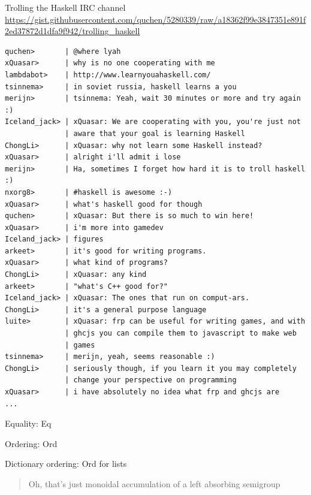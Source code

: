 \documentclass[8pt]{beamer}
\begin{document}
\begin{frame}[fragile]{Trolling the Haskell IRC channel}
{\tiny \url{https://gist.githubusercontent.com/quchen/5280339/raw/a18362f99e3847351e891f2ed37872d1dfa9f942/trolling_haskell}}
{\tiny
\begin{verbatim}
quchen>       | @where lyah
xQuasar>      | why is no one cooperating with me
lambdabot>    | http://www.learnyouahaskell.com/
tsinnema>     | in soviet russia, haskell learns a you
merijn>       | tsinnema: Yeah, wait 30 minutes or more and try again :)
Iceland_jack> | xQuasar: We are cooperating with you, you're just not 
              | aware that your goal is learning Haskell
ChongLi>      | xQuasar: why not learn some Haskell instead?
xQuasar>      | alright i'll admit i lose
merijn>       | Ha, sometimes I forget how hard it is to troll haskell :)
nxorg8>       | #haskell is awesome :-)
xQuasar>      | what's haskell good for though
quchen>       | xQuasar: But there is so much to win here!
xQuasar>      | i'm more into gamedev
Iceland_jack> | figures
arkeet>       | it's good for writing programs.
xQuasar>      | what kind of programs?
ChongLi>      | xQuasar: any kind
arkeet>       | "what's C++ good for?"
Iceland_jack> | xQuasar: The ones that run on comput-ars.
ChongLi>      | it's a general purpose language
luite>        | xQuasar: frp can be useful for writing games, and with 
              | ghcjs you can compile them to javascript to make web 
              | games
tsinnema>     | merijn, yeah, seems reasonable :)
ChongLi>      | seriously though, if you learn it you may completely 
              | change your perspective on programming
xQuasar>      | i have absolutely no idea what frp and ghcjs are
...
\end{verbatim}
}
\end{frame}


\begin{frame}{Equality: Eq}
\end{frame}

\begin{frame}[fragile]{Ordering: Ord}
\end{frame}
\begin{frame}[fragile]{Dictionary ordering: Ord for lists}
\begin{quote}
Oh, that's just monoidal accumulation of a left absorbing semigroup
\end{quote}
\end{frame}
\end{document}
